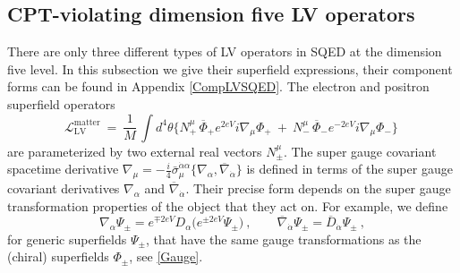 \documentclass[12pt]{revtex4}
\begin{document}
\subsection{CPT-violating dimension five LV operators}
\label{Dim5LV}


There are only three different types of LV operators in SQED at the
dimension five level. In this subsection we give their superfield
expressions, their component forms can be found in Appendix
\ref{CompLVSQED}. The electron and positron superfield operators  
\begin{equation}
\label{LV_matter}
  \mathcal{L}_{\mathrm{LV}}^{\mathrm{matter}} ~=~ 
\frac{1}{M}\,   \int d^4\theta \Big\{ 
N_+^\mu\, \overline{\Phi}_+ e^{2eV} i \nabla_\mu \Phi_+ 
~+~ N_{-}^\mu\, \overline{\Phi}_- e^{-2eV} i \nabla_\mu  {\Phi}_-
                 \Big\}~
\end{equation}
are parameterized by two external real vectors $N_\pm^\mu$.  
The super gauge covariant spacetime derivative 
$\nabla_\mu   =  - \frac{i}{4} 
\bar{\sigma}_\mu^{\dot{\alpha}\alpha}
\{ \nabla_\alpha, \overline{\nabla}_{\dot{\alpha}} \} 
$ 
is defined in terms of the super gauge covariant derivatives 
$\nabla_\alpha$ and $\overline{\nabla}_{\dot{\alpha}}$. Their precise
form depends on the super gauge transformation properties of the
object that they act on. For example, we define 
\begin{equation}
\nabla_\alpha \Psi_\pm = 
e^{\mp 2eV} D_\alpha \big( e^{\pm 2eV} \Psi_\pm \big)~, 
\qquad 
\overline{\nabla}_{\dot{\alpha}} \Psi_\pm =
\overline{D}_{\dot{\alpha}} \Psi_\pm~,
\end{equation} 
for generic superfields $\Psi_\pm$, that have the same gauge
transformations as the (chiral) superfields $\Phi_\pm$, see 
\eqref{Gauge}. 
\end{document}
